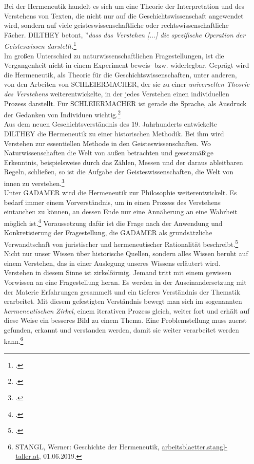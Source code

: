 \documentclass[12pt,a4paper]{article}
\begin{document}
Bei der Hermeneutik handelt es sich um eine Theorie der Interpretation und des Verstehens von Texten, die nicht nur auf die Geschichtswissenschaft angewendet wird, sondern auf viele geisteswissenschaftliche oder rechtswissenschaftliche Fächer.
DILTHEY betont, ''\textit{dass das Verstehen [...] die spezifische Operation der Geisteswissen darstellt.}\footcite[][S.82]{ficara2015hermeneutik}
\\
Im großen Unterschied zu naturwissenschaftlichen Fragestellungen, ist die Vergangenheit nicht in einem Experiment beweis- bzw. widerlegbar. Geprägt wird die Hermeneutik, als Theorie für die Geschichtswissenschaften, unter anderen, von den Arbeiten von SCHLEIERMACHER, der sie zu einer \textit{universellen Theorie des Verstehens} weiterentwickelte, in der jedes Verstehen einen individuellen Prozess darstellt. Für SCHLEIERMACHER ist gerade die Sprache, als Ausdruck der Gedanken von Individuen wichtig.\footcite[][S.72-81]{ficara2015hermeneutik} 
\\
Aus dem neuen Geschichtsverständnis des 19. Jahrhunderts entwickelte DILTHEY die Hermeneutik zu einer historischen Methodik. Bei ihm wird Verstehen zur essentiellen Methode in den Geisteswissenschaften. Wo Naturwissenschaften die Welt von außen betrachten und gesetzmäßige Erkenntnis, beispielsweise durch das Zählen, Messen und der daraus ableitbaren Regeln, schließen, so ist die Aufgabe der Geisteswissenschaften, die Welt von innen zu verstehen.\footcite[][S.82-83]{ficara2015hermeneutik}
\\
Unter GADAMER wird die Hermeneutik zur Philosophie weiterentwickelt. Es bedarf immer einem Vorverständnis, um in einen Prozess des Verstehens eintauchen zu können, an dessen Ende nur eine Annäherung an eine Wahrheit möglich ist.\footcite[][S.19-30]{schulz2010neuere} Voraussetzung dafür ist die Frage nach der Anwendung und Konkretisierung der Fragestellung, die GADAMER als grundsätzliche Verwandtschaft von juristischer und hermeneutischer Rationalität beschreibt.\footcite[][S.176-178]{ficara2015hermeneutik}
\\
Nicht nur unser Wissen über historische Quellen, sondern alles Wissen beruht auf einem Verstehen, das in einer Auslegung unseres Wissens erläutert wird. Verstehen in diesem Sinne ist zirkelförmig. Jemand tritt mit einem gewissen Vorwissen an eine Fragestellung heran. Es werden in der Auseinandersetzung mit der Materie Erfahrungen gesammelt und ein tieferes Verständnis der Thematik erarbeitet. Mit diesem gefestigten Verständnis bewegt man sich im sogenannten  \textit{hermeneutischen Zirkel}, einem iterativen Prozess gleich, weiter fort und erhält auf diese Weise ein besseres Bild zu einem Thema. Eine Problemstellung muss zuerst gefunden, erkannt und verstanden werden, damit sie weiter verarbeitet werden kann.\footnote{STANGL, Werner: Geschichte der Hermeneutik, \protect\url{arbeitsblaetter.stangl-taller.at}, 01.06.2019.}
\end{document}
